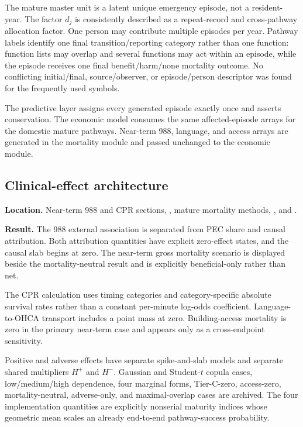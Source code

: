 \documentclass[10pt]{article}
\begin{document}
The mature master unit is a latent unique emergency episode, not a resident-year.
The factor $d_j$ is consistently described as a repeat-record and cross-pathway
allocation factor.  One person may contribute multiple episodes per year.
Pathway labels identify one final transition/reporting category rather than one
function: function lists may overlap and several functions may act within an
episode, while the episode receives one final benefit/harm/none mortality
outcome.  No conflicting initial/final, source/observer, or episode/person
descriptor was found for the frequently used symbols.

The predictive layer assigns every generated episode exactly once and asserts
conservation.  The economic model consumes the same affected-episode arrays for
the domestic mature pathways.  Near-term 988, language, and access arrays are
generated in the mortality module and passed unchanged to the economic module.

\subsection*{Clinical-effect architecture}

\textbf{Location.} Near-term 988 and CPR sections,
, mature mortality methods,
, and
.

\textbf{Result.} The 988 external association is separated from PEC share and
causal attribution.  Both attribution quantities have explicit zero-effect
states, and the causal slab begins at zero.  The near-term gross mortality
scenario is displayed beside the mortality-neutral result and is explicitly
beneficial-only rather than net.

The CPR calculation uses timing categories and category-specific absolute
survival rates rather than a constant per-minute log-odds coefficient.
Language-to-OHCA transport includes a point mass at zero.  Building-access
mortality is zero in the primary near-term case and appears only as a
cross-endpoint sensitivity.

Positive and adverse effects have separate spike-and-slab models and separate
shared multipliers $H^+$ and $H^-$.  Gaussian and Student-$t$ copula cases,
low/medium/high dependence, four marginal forms, Tier-C-zero, access-zero,
mortality-neutral, adverse-only, and maximal-overlap cases are archived.  The
four implementation quantities are explicitly nonserial maturity indices whose
geometric mean scales an already end-to-end pathway-success probability.
\end{document}
